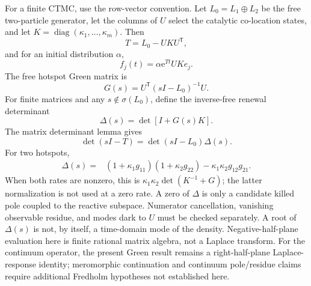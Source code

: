 \documentclass[aps,pre,reprint,amsmath,amssymb,longbibliography,floatfix]{revtex4-2}
\newcommand{\e}{\mathrm e}
\begin{document}
For a finite CTMC, use the row-vector convention. Let \(L_0=L_1\oplus L_2\)
be the free two-particle generator, let the columns of \(U\) select the
catalytic co-location states, and let
\(K=\operatorname{diag}(\kappa_1,\ldots,\kappa_m)\). Then
\begin{equation}
T=L_0-UKU^\mathsf T,
\label{eq:finite-killed}
\end{equation}
and for an initial distribution \(\alpha\),
\begin{equation}
f_j(t)=\alpha\e^{Tt}UK e_j.
\label{eq:finite-channel}
\end{equation}
The free hotspot Green matrix is
\begin{equation}
G(s)=U^\mathsf T(sI-L_0)^{-1}U.
\label{eq:hotspot-green}
\end{equation}
For finite matrices and any \(s\notin\sigma(L_0)\), define the inverse-free
renewal determinant
\begin{equation}
\Delta(s)=\det[I+G(s)K].
\label{eq:renewal-det}
\end{equation}
The matrix determinant lemma gives
\begin{equation}
\det(sI-T)=\det(sI-L_0)\Delta(s).
\label{eq:finite-det-lemma}
\end{equation}
For two hotspots,
\begin{align}
\Delta(s)={}&(1+\kappa_1g_{11})(1+\kappa_2g_{22})
-\kappa_1\kappa_2g_{12}g_{21}.
\label{eq:two-hotspot-det}
\end{align}
When both rates are nonzero, this is
\(\kappa_1\kappa_2\det(K^{-1}+G)\); the latter normalization is not used at a
zero rate. A zero of \(\Delta\) is only a candidate killed pole coupled to the
reactive subspace.
Numerator cancellation, vanishing observable residue, and modes dark to
\(U\) must be checked separately. A root of \(\Delta(s)\) is not, by itself,
a time-domain mode of the density. Negative-half-plane evaluation here is
finite rational matrix algebra, not a Laplace transform. For the continuum
operator, the present Green result remains a right-half-plane Laplace-response
identity; meromorphic continuation and continuum pole/residue claims require
additional Fredholm hypotheses not established here.
\end{document}
